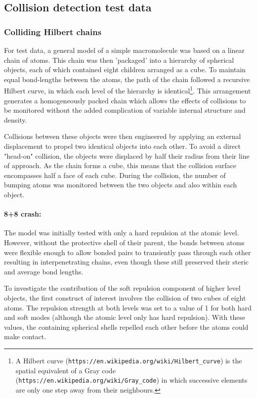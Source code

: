 \subsection{Collision detection test data}

\subsubsection{Colliding Hilbert chains}

For test data,
a general model of a simple macromolecule was based on a linear chain of atoms.
This chain was then 'packaged' into a hierarchy of spherical objects, each of which contained
eight children arranged as a cube.   To maintain equal bond-lengths between the atoms, the path of the
chain followed a recursive Hilbert curve, in which each level of the hierarchy is identical\footnote{
A Hilbert curve ({\tt https://en.wikipedia.org/wiki/Hilbert\_curve}) is the spatial equivalent of a 
Gray code ({\tt https://en.wikipedia.org/wiki/Gray\_code}) in which successive elements are
only one step away from their neighbours.
}.   This arrangement generates a homogeneously packed chain which allows the effects of
collisions to be monitored without the added complication of variable internal structure and density.

Collisions between these objects were then engineered by applying an external
displacement to propel two identical objects into each other.   To avoid a direct "head-on"
collision, the objects were displaced by half their radius from their line of approach.
As the chain forms a cube, this means that the collision surface encompasses half a face of each cube.
During the collision, the number of bumping atoms was monitored between the two objects
and also within each object.

\paragraph{8+8 crash:\\}

The model was initially tested with only a hard repulsion at the atomic level.
However, without the protective shell of their parent, the bonds between atoms were flexible enough 
to allow bonded pairs to transiently pass through each other resulting 
in interpenetrating chains, even though these still preserved their steric and average bond lengths.

To investigate the contribution of the soft repulsion component of higher level objects,
the first construct of interest involves the collision of two cubes of eight atoms.  The
repulsion strength at both levels was set to a value of 1 for both hard and soft modes
(although the atomic level only has hard repulsion).   With these values, the containing
spherical shells repelled each other before the atoms could make contact.

